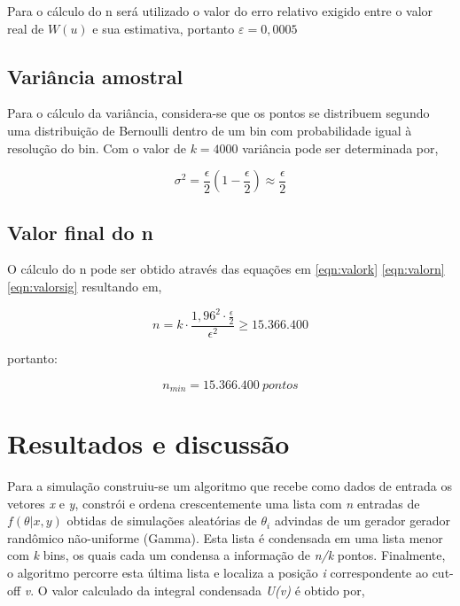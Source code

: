 \documentclass{article}
\begin{document}
Para o cálculo do n será utilizado o valor do erro relativo exigido entre o valor real de $W(u)$ e sua estimativa, portanto $\varepsilon = 0,0005$

\subsection{Variância amostral}

Para o cálculo da variância, considera-se que os pontos se distribuem segundo uma distribuição de Bernoulli dentro de um bin com probabilidade igual à resolução do bin. Com o valor de $k = 4000$ variância pode ser determinada por,

\begin{equation}
    \sigma^2 = \frac{\epsilon}{2} (1 - \frac{\epsilon}{2}) \approx \frac{\epsilon}{2}
    \label{eqn:valorsig}
\end{equation}

\subsection{Valor final do n}

O cálculo do n pode ser obtido através das equações em \ref{eqn:valork} \ref{eqn:valorn} \ref{eqn:valorsig} resultando em,

\begin{equation*}
    n = k \cdot \frac{1,96^2\cdot \frac{\epsilon}{2}}{\epsilon^2} \geq 15.366.400
\end{equation*}

portanto:

\[
    n_{min} = 15.366.400 \ pontos
\]

\section{Resultados e discussão}

Para a simulação construiu-se um algoritmo que recebe como dados de entrada os vetores \textit{x} e \textit{y}, constrói e ordena crescentemente uma lista com \textit{n} entradas de $f(\theta|x,y)$ obtidas de simulações aleatórias de $\theta_i$ advindas de um gerador gerador randômico não-uniforme (Gamma). Esta lista é condensada em uma lista menor com \textit{k} bins, os quais cada um condensa a informação de  \textit{n/k} pontos. Finalmente, o algoritmo percorre esta última lista e localiza a posição \textit{i} correspondente ao cut-off \textit{v}. O valor calculado da integral condensada \textit{U(v)} é obtido por,
\end{document}
